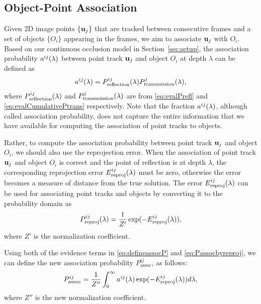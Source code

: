 \subsection{Object-Point Association}
\label{sec:association}


Given 2D image points $\{\mathbf{u}_j\}$ that are tracked between consecutive frames and a set of objects $\{O_i\}$ appearing in the frames, we aim to associate $\mathbf{u}_j$ with $O_i$. Based on our continuous occlusion model in Section~\ref{sec:setup}, the association probability $a^{ij}(\lambda)$ between point track $\mathbf{u}_j$ and object $O_i$ at depth $\lambda$ can be defined as
\begin{align}
a^{ij}(\lambda) = P^{ij}_{\text{reflection}}(\lambda)P^{j}_{\text{transmission}}(\lambda),
\label{eq:defineassocP}
\end{align}
where $P^{ij}_{\text{reflection}}(\lambda)$ and $P^{j}_{\text{transmission}}(\lambda)$ are from \eqref{eq:evalPrefl} and \eqref{eq:evalCumulativePtrans} respectively. Note that the fraction $a^{ij}(\lambda)$, although called association probability, does not capture the entire information that we have available for computing the association of point tracks to objects. 

Rather, to compute the association probability between point track $\mathbf{u}_j$ and object $O_i$, we should also use the reprojection error. When the association of point track $\mathbf{u}_j$ and object $O_i$ is correct and the point of reflection is at depth $\lambda$, the corresponding reprojection error $E^{ij}_{\text{reproj}}(\lambda)$ must be zero, otherwise the error becomes a measure of distance from the true solution. The error $E^{ij}_{\text{reproj}}(\lambda)$ can be used for associating point tracks and objects by converting it to the probability domain as
\begin{align}
  P^{ij}_{\text{reproj}}(\lambda) = \frac{1}{Z'}\exp(-E^{ij}_{\text{reproj}}(\lambda)),
\label{eq:Passocbyreproj}
\end{align}
where $Z'$ is the normalization coefficient.

Using both of the evidence terms in \eqref{eq:defineassocP} and \eqref{eq:Passocbyreproj}, we can define the new association probability $P^{ij}_{\text{assoc}}$, as follows:
\begin{align}
  P^{ij}_{\text{assoc}} = \frac{1}{Z''}\int_0^{\infty} a^{ij}(\lambda) \exp(-E^{ij}_{\text{reproj}}(\lambda))d\lambda,
  \label{eq:prob-assoc}
\end{align}
where $Z''$ is the new normalization coefficient.


